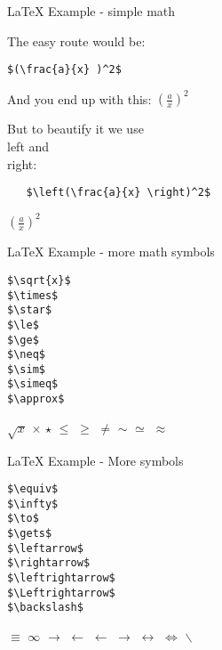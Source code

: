 \begin{frame}[t,fragile]{LaTeX Example - simple math}


The easy route would be:
\begin{lstlisting}
$(\frac{a}{x} )^2$
\end{lstlisting}

And you end up with this: $(\frac{a}{x} )^2$

But to beautify it we use \\left and \\right:

  \begin{lstlisting}
   $\left(\frac{a}{x} \right)^2$
  \end{lstlisting}
   $\left(\frac{a}{x} \right)^2$

\end{frame}

\begin{frame}[t,fragile]{LaTeX Example - more math symbols}


  \begin{lstlisting}
$\sqrt{x}$
$\times$
$\star$
$\le$
$\ge$
$\neq$
$\sim$
$\simeq$
$\approx$
  \end{lstlisting}

$\sqrt{x}$
$\times$
$\star$
$\le$
$\ge$
$\neq$
$\sim$
$\simeq$
$\approx$
\end{frame}

\begin{frame}[t,fragile]{LaTeX Example - More symbols}
  \begin{lstlisting}
$\equiv$
$\infty$
$\to$
$\gets$
$\leftarrow$
$\rightarrow$
$\leftrightarrow$
$\Leftrightarrow$
$\backslash$
  \end{lstlisting}

$\equiv$
$\infty$
$\to$
$\gets$
$\leftarrow$
$\rightarrow$
$\leftrightarrow$
$\Leftrightarrow$
$\backslash$

\end{frame}

